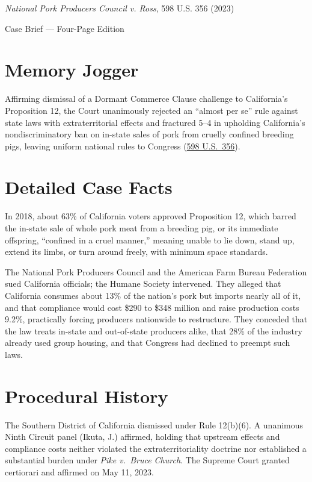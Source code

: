 \documentclass[12pt]{article}
\begin{document}
\begin{center}
{\LARGE \textit{National Pork Producers Council v. Ross}, 598 U.S. 356 (2023)\par}
\vspace{0.8em}
{\large Case Brief --- Four-Page Edition\par}
\end{center}
\vspace{1em}

\section{Memory Jogger}

Affirming dismissal of a Dormant Commerce Clause challenge to California's Proposition 12, the Court unanimously rejected an ``almost per se'' rule against state laws with extraterritorial effects and fractured 5--4 in upholding California's nondiscriminatory ban on in-state sales of pork from cruelly confined breeding pigs, leaving uniform national rules to Congress (\href{https://www.law.cornell.edu/supremecourt/text/21-468}{598 U.S.\ 356}).

\section{Detailed Case Facts}

In 2018, about 63\% of California voters approved Proposition 12, which barred the in-state sale of whole pork meat from a breeding pig, or its immediate offspring, ``confined in a cruel manner,'' meaning unable to lie down, stand up, extend its limbs, or turn around freely, with minimum space standards.

The National Pork Producers Council and the American Farm Bureau Federation sued California officials; the Humane Society intervened. They alleged that California consumes about 13\% of the nation's pork but imports nearly all of it, and that compliance would cost \$290 to \$348 million and raise production costs 9.2\%, practically forcing producers nationwide to restructure. They conceded that the law treats in-state and out-of-state producers alike, that 28\% of the industry already used group housing, and that Congress had declined to preempt such laws.

\section{Procedural History}

The Southern District of California dismissed under Rule 12(b)(6). A unanimous Ninth Circuit panel (Ikuta, J.) affirmed, holding that upstream effects and compliance costs neither violated the extraterritoriality doctrine nor established a substantial burden under \textit{Pike v.\ Bruce Church}. The Supreme Court granted certiorari and affirmed on May 11, 2023.
\end{document}
